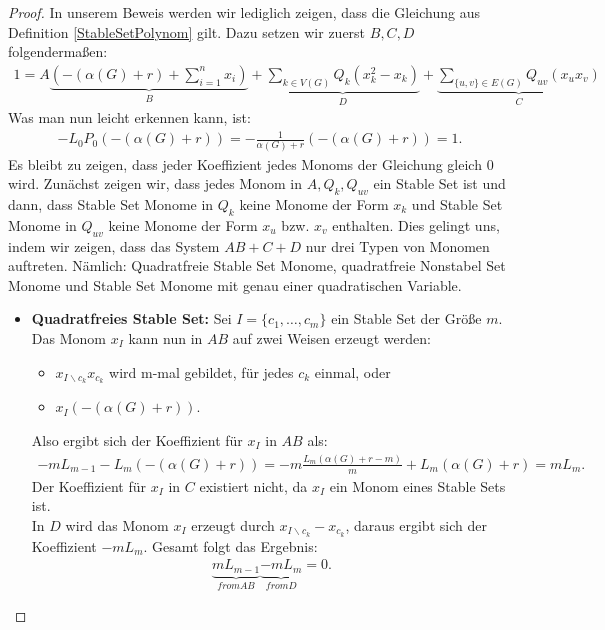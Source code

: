 \begin{proof}
In unserem Beweis werden wir lediglich zeigen, dass die Gleichung aus Definition \ref{StableSetPolynom} gilt. Dazu setzen wir zuerst $B,C,D$ folgendermaßen:
\begin{align*}
1 = A\underbrace{\left(-(\alpha(G) + r) + \sum_{i=1}^nx_i\right)}_{B}+\underbrace{\sum_{k \in V(G)} Q_k(x_k^2-x_k)}_{D}+\underbrace{\sum_{\{u,v\}\in E(G)} Q_{uv}(x_ux_v)}_{C}
\end{align*}
Was man nun leicht erkennen kann, ist:
\begin{align*}
-L_0P_0\left(-(\alpha(G)+r)\right) = - \frac{1}{\alpha(G)+r}\left(-(\alpha(G)+r)\right) = 1.
\end{align*}
Es bleibt zu zeigen, dass jeder Koeffizient jedes Monoms der Gleichung gleich $0$ wird. Zunächst zeigen wir, dass jedes Monom in $A,Q_k,Q_{uv}$ ein Stable Set ist und dann, dass Stable Set Monome in $Q_k$ keine Monome der Form $x_k$ und Stable Set Monome in $Q_{uv}$ keine Monome der Form $x_u$ bzw. $x_v$ enthalten. Dies gelingt uns, indem wir zeigen, dass das System $AB+C+D$  nur drei Typen von Monomen auftreten. Nämlich: Quadratfreie Stable Set Monome, quadratfreie Nonstabel Set Monome und Stable Set Monome mit genau einer quadratischen Variable.\\
\begin{itemize}
\item \textbf{Quadratfreies Stable Set:} Sei $I=\{c_1,\ldots,c_m\}$ ein Stable Set der Größe $m$. Das Monom $x_I$ kann nun in $AB$ auf zwei Weisen erzeugt werden:\\
\begin{itemize}
\item $x_{I\backslash c_k}x_{c_k}$ wird m-mal gebildet, für jedes $c_k$ einmal, oder
\item $x_I\left(-(\alpha(G)+r)\right)$.
\end{itemize}
Also ergibt sich der Koeffizient für $x_I$ in \textbf{$AB$} als:
\begin{align*}
-mL_{m-1}-L_m\left(-(\alpha(G)+r)\right) = -m \frac{L_m(\alpha(G)+r-m)}{m} + L_m(\alpha(G)+r) = mL_m.
\end{align*}
Der Koeffizient für $x_I$ in \textbf{$C$} existiert nicht, da $x_I$ ein Monom eines Stable Sets ist.\\
In \textbf{$D$} wird das Monom $x_I$ erzeugt durch $x_{I\backslash c_k}-x_{c_k}$, daraus ergibt sich der Koeffizient $-mL_m$. Gesamt folgt das Ergebnis:
\begin{align*}
\underbrace{mL_{m-1}}_{from AB}  \underbrace{-mL_m}_{from D} = 0.

\end{align*}
\end{itemize}
\end{proof}
